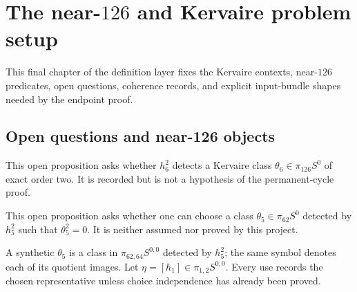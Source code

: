 \chapter{The near-$126$ and Kervaire problem setup}
\label{chap:kervaire-setup}

This final chapter of the definition layer fixes the Kervaire contexts, near-$126$ predicates, open questions, coherence records, and explicit input-bundle shapes needed by the endpoint proof.

\section{Open questions and near-126 objects}

\begin{definition}
  \label{def:question-order-two-theta6}
  \notready
  This open proposition asks whether $h_6^2$ detects a Kervaire class
  $\theta_6\in\pi_{126}S^0$ of exact order two.  It is recorded but is not a
  hypothesis of the permanent-cycle proof.
\end{definition}

\begin{definition}[$\theta_5^2=0$ question]
  \label{def:question-theta5-square-zero}
  \notready
  This open proposition asks whether one can choose a class
  $\theta_5\in\pi_{62}S^0$ detected by $h_5^2$ such that
  $\theta_5^2=0$.  It is neither assumed nor proved by this project.
\end{definition}

\begin{definition}
  \label{def:synthetic-theta5-choice}
  \notready
  A synthetic $\theta_5$ is a class in
  $\pi_{62,64}S^{0,0}$ detected by $h_5^2$; the same symbol denotes each of its
  quotient images.  Let $\eta=[h_1]\in\pi_{1,2}S^{0,0}$.  Every use records
  the chosen representative unless choice independence has already been
  proved.
\end{definition}

